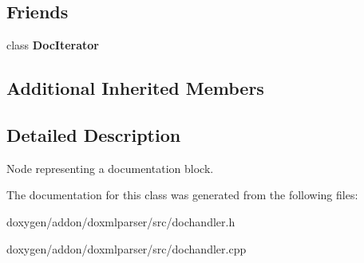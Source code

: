 \subsection*{Friends}
\begin{DoxyCompactItemize}
\item 
\mbox{\label{class_doc_handler_a531bd66459994eb17758adefa70d27dd}} 
class {\bfseries Doc\+Iterator}
\end{DoxyCompactItemize}
\subsection*{Additional Inherited Members}


\subsection{Detailed Description}
Node representing a documentation block. 



The documentation for this class was generated from the following files\+:\begin{DoxyCompactItemize}
\item 
doxygen/addon/doxmlparser/src/dochandler.\+h\item 
doxygen/addon/doxmlparser/src/dochandler.\+cpp\end{DoxyCompactItemize}
